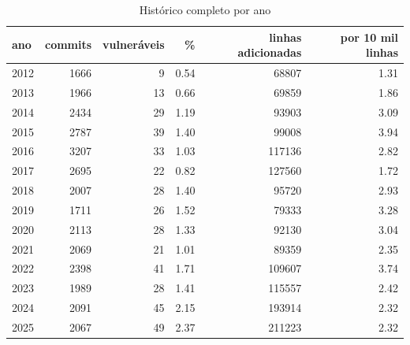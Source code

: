 \begin{table}[htbp]
\centering
\caption{Histórico completo por ano}
\label{tab:per_year_full}
\begin{tabular}{lrrrrr}
\toprule
ano & commits & vulneráveis & \% & linhas adicionadas & por 10 mil linhas \\
\midrule
2012 & 1666 & 9 & 0.54 & 68807 & 1.31 \\
2013 & 1966 & 13 & 0.66 & 69859 & 1.86 \\
2014 & 2434 & 29 & 1.19 & 93903 & 3.09 \\
2015 & 2787 & 39 & 1.40 & 99008 & 3.94 \\
2016 & 3207 & 33 & 1.03 & 117136 & 2.82 \\
2017 & 2695 & 22 & 0.82 & 127560 & 1.72 \\
2018 & 2007 & 28 & 1.40 & 95720 & 2.93 \\
2019 & 1711 & 26 & 1.52 & 79333 & 3.28 \\
2020 & 2113 & 28 & 1.33 & 92130 & 3.04 \\
2021 & 2069 & 21 & 1.01 & 89359 & 2.35 \\
2022 & 2398 & 41 & 1.71 & 109607 & 3.74 \\
2023 & 1989 & 28 & 1.41 & 115557 & 2.42 \\
2024 & 2091 & 45 & 2.15 & 193914 & 2.32 \\
2025 & 2067 & 49 & 2.37 & 211223 & 2.32 \\
\bottomrule
\end{tabular}
\end{table}
